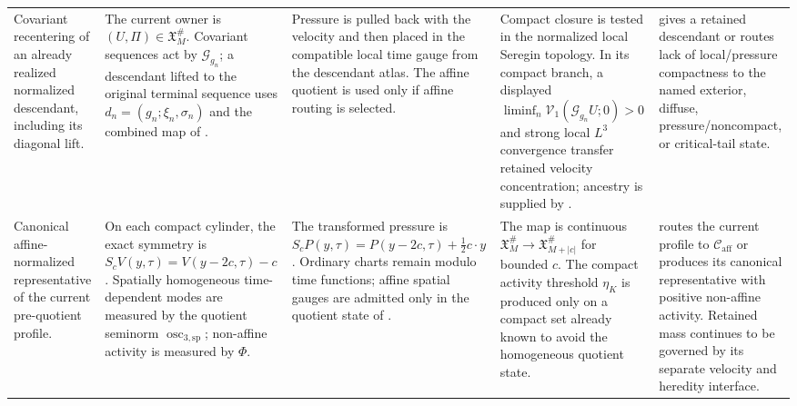 \documentclass[11pt]{amsart}
\numberwithin{equation}{section}
\theoremstyle{plain}
\theoremstyle{definition}
\theoremstyle{remark}
\newcommand{\Vel}{\mathcal V}
\newcommand{\Caff}{\mathcal C_{\mathrm{aff}}}
\newcommand{\oscsp}{\operatorname{osc}_{3,\mathrm{sp}}}
\begin{document}
\begin{longtable}{@{}L{0.15\textwidth}L{0.19\textwidth}L{0.20\textwidth}L{0.20\textwidth}L{0.18\textwidth}@{}}
Covariant recentering of an already realized normalized descendant, including
its diagonal lift. &
The current owner is \((U,\Pi)\in\mathfrak X_M^\#\).  Covariant sequences act
by \(\mathscr G_{g_n}\); a descendant lifted to the original terminal sequence
uses \(d_n=(g_n;\xi_n,\sigma_n)\) and the combined map of
. &
Pressure is pulled back with the velocity and then placed in the compatible
local time gauge from the descendant atlas.  The affine quotient is used only
if affine routing is selected. &
Compact closure is tested in the normalized local Seregin topology.  In its
compact branch, a displayed
\(\liminf_n\Vel_1(\mathscr G_{g_n}U;0)>0\) and strong local \(L^3\) convergence
transfer retained velocity concentration; ancestry is supplied by
. &
gives a retained descendant or routes lack of local/pressure compactness to the
named exterior, diffuse, pressure/noncompact, or critical-tail state.\\

Canonical affine-normalized representative of the current pre-quotient
profile. &
On each compact cylinder, the exact symmetry is
\(S_cV(y,\tau)=V(y-2c,\tau)-c\).  Spatially homogeneous time-dependent modes
are measured by the quotient seminorm \(\oscsp\); non-affine activity is
measured by \(\Phi\). &
The transformed pressure is
\(S_cP(y,\tau)=P(y-2c,\tau)+\tfrac12c\cdot y\).  Ordinary charts remain modulo
time functions; affine spatial gauges are admitted only in the quotient state
of . &
The map is continuous
\(\mathfrak X_M^\#\to\mathfrak X_{M+|c|}^\#\) for bounded \(c\).  The compact
activity threshold \(\eta_K\) is produced only on a compact set already known
to avoid the homogeneous quotient state. &
routes the current profile to \(\Caff\) or produces its canonical representative
with positive non-affine activity.  Retained mass continues to be governed by
its separate velocity and heredity interface.\\


\end{longtable}
\end{document}
